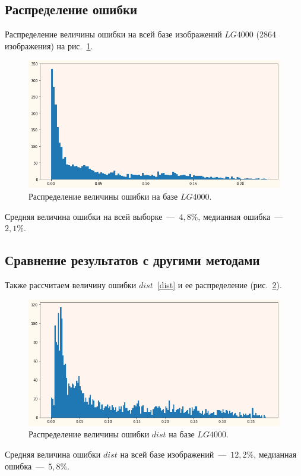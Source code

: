 \documentclass[12pt,a4paper]{article} %
\begin{document}
\subsection{Распределение ошибки}
Распределение величины ошибки на всей базе изображений $LG4000$ (2864 изображения) на рис.~\ref{fig:gist}. 

\begin{figure}[h]
	\centering
	
	\includegraphics[width=0.67\linewidth]{gist.jpg}
	\caption{Распределение величины ошибки на базе $LG4000$.}
	
	\label{fig:gist}
\end{figure}

Средняя величина ошибки на всей выборке~---~$4,8\%$, медианная ошибка~---~$2,1\%$.


\subsection{Сравнение результатов с другими методами}
Также рассчитаем величину ошибки $dist$~\eqref{dist} и ее распределение (рис.~\ref{fig:gist2}).

\begin{figure}[h]
	\centering
	
	\includegraphics[width=0.67\linewidth]{gist2.jpg}
	\caption{Распределение величины ошибки $dist$ на базе $LG4000$.}
	
	\label{fig:gist2}
\end{figure}

Средняя величина ошибки $dist$ на всей базе изображений~---~$12,2\%$, медианная ошибка~---~$5,8\%$.
\end{document}
